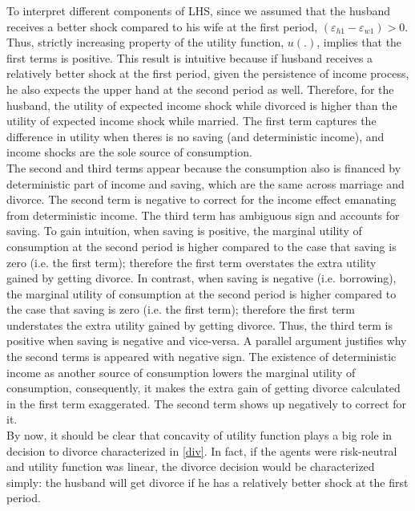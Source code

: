 To interpret different components of LHS, since we assumed that the husband receives a better shock compared to his wife at the first period, $ (\varepsilon_{h1} - \varepsilon_{w1}) > 0$.  Thus, strictly increasing property of the utility function, $u(.)$, implies that the first terms is positive. This result is intuitive because if husband receives a relatively better shock at the first period, given the persistence of income process, he also expects the upper hand at the second period as well. Therefore, for the husband, the utility of expected income shock while divorced is higher than the utility of expected income shock while married. The first term captures the difference in utility when theres is no saving (and deterministic income), and income shocks are the sole source of consumption. \\

The second and third terms appear because the consumption also is financed by deterministic part of income and saving, which are the same across marriage and divorce. The second term is negative to correct for the income effect emanating from deterministic income. The third term has ambiguous sign and accounts for saving. To gain intuition, when saving is positive, the marginal utility of consumption at the second period is higher compared to the case that saving is zero (i.e. the first term); therefore the first term overstates the extra utility gained by getting divorce. In contrast, when saving is negative (i.e. borrowing), the marginal utility of consumption at the second period is higher compared to the case that saving is zero (i.e. the first term); therefore the first term understates the extra utility gained by getting divorce. Thus, the third term is positive when saving is negative and vice-versa. A parallel argument justifies why the second terms is appeared with negative sign. The existence of deterministic income as another source of consumption lowers the marginal utility of consumption, consequently, it makes the extra gain of getting divorce calculated in the first term exaggerated. The second term shows up negatively to correct for it.  \\

By now, it should be clear that concavity of utility function plays a big role in decision to divorce characterized in  \eqref{div}. In fact, if the agents were risk-neutral and utility function was linear, the divorce decision would be characterized simply: the husband will get divorce if he has a relatively better shock at the first period. \\

